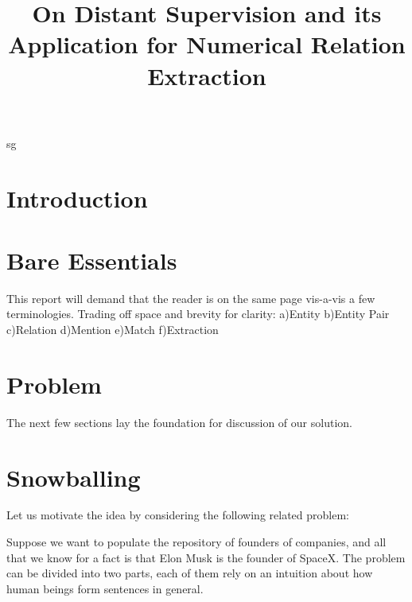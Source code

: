 \documentclass[a4paper,10pt]{article}
\title{On Distant Supervision and its Application for Numerical Relation Extraction}
\author{}
\begin{document}
 
sg
\maketitle

\begin{abstract}

\end{abstract}

\section{Introduction}

\section{Bare Essentials}
This report will demand that the reader is on the same page vis-a-vis a few terminologies.
Trading off space and brevity for clarity:
a)Entity
b)Entity Pair
c)Relation
d)Mention
e)Match
f)Extraction

\section{Problem}

The next few sections lay the foundation for discussion of our solution.
  
\section{Snowballing}
Let us motivate the idea by considering the following related problem:

Suppose we want to populate the repository of founders of companies, and all that we know
for a fact is that Elon Musk is the founder of SpaceX.
The problem can be divided into two parts, each of them rely on an intuition about how human 
beings form sentences in general.
\end{document}
